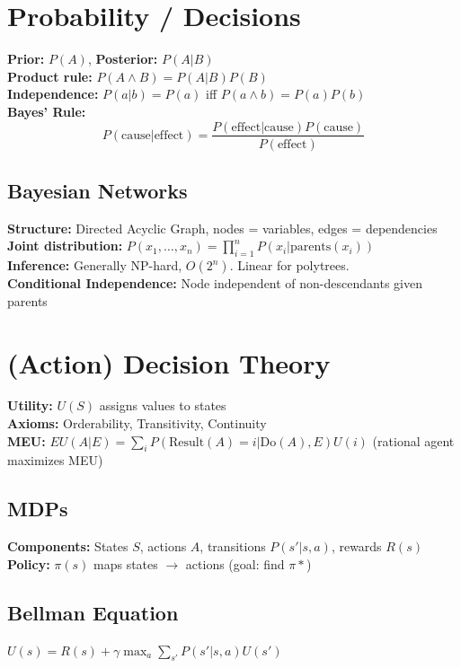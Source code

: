 \documentclass[8pt,landscape,a4paper]{article}
\begin{document}
\begin{multicols*}{3}
\section{Probability / Decisions}
\textbf{Prior:} $P(A)$, \textbf{Posterior:} $P(A|B)$\\
\textbf{Product rule:} $P(A \wedge B) = P(A|B)P(B)$\\
\textbf{Independence:} $P(a|b) = P(a)$ iff $P(a \wedge b) = P(a)P(b)$\\
\textbf{Bayes' Rule:}
$$P(\text{cause}|\text{effect}) = \frac{P(\text{effect}|\text{cause})P(\text{cause})}{P(\text{effect})}$$

\subsection{Bayesian Networks}
\textbf{Structure:} Directed Acyclic Graph, nodes = variables, edges = dependencies\\
\textbf{Joint distribution:} $P(x_1,\ldots,x_n) = \prod_{i=1}^n P(x_i|\text{parents}(x_i))$\\
\textbf{Inference:} Generally NP-hard, $O(2^n)$. Linear for polytrees.\\
\textbf{Conditional Independence:} Node independent of non-descendants given parents

\section{(Action) Decision Theory}
\textbf{Utility:} $U(S)$ assigns values to states\\
\textbf{Axioms:} Orderability, Transitivity, Continuity\\
\textbf{MEU:} $EU(A|E) = \sum_i P(\text{Result}(A)=i|\text{Do}(A),E)U(i)$ (rational agent maximizes MEU)

\subsection{MDPs}
\textbf{Components:} States $S$, actions $A$, transitions $P(s'|s,a)$, rewards $R(s)$\\
\textbf{Policy:} $\pi(s)$ maps states $\rightarrow$ actions (goal: find $\pi*$)

\subsection{Bellman Equation}
$U(s) = R(s) + \gamma \max_a \sum_{s'} P(s'|s,a)U(s')$ \\


\end{multicols*}
\end{document}
